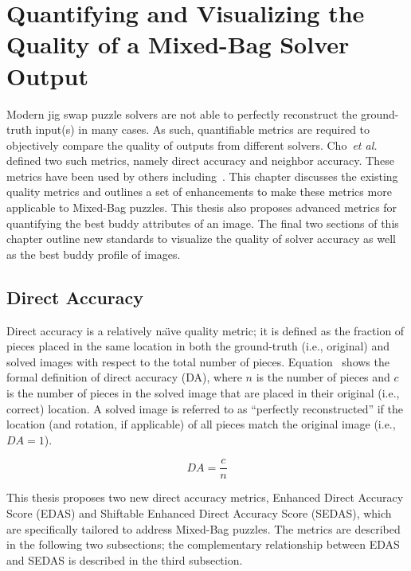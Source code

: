 \chapter{Quantifying and Visualizing the Quality of a Mixed-Bag Solver Output}\label{chap:quantifyingSolverQuantify}

Modern jig swap puzzle solvers are not able to perfectly reconstruct the ground-truth input(s) in many cases.  As such, quantifiable metrics are required to objectively compare the quality of outputs from different solvers.  Cho~\textit{et al.}~\cite{cho2010} defined two such metrics, namely direct accuracy and neighbor accuracy. These metrics have been used by others including~\cite{sholomon2013, pomeranz2011, paikin2015, son2014, gallagher2012}.  This chapter discusses the existing quality metrics and outlines a set of enhancements to make these metrics more applicable to Mixed-Bag puzzles.  This thesis also proposes advanced metrics for quantifying the best buddy attributes of an image.  The final two sections of this chapter outline new standards to visualize the quality of solver accuracy as well as the best buddy profile of images.

\section{Direct Accuracy}\label{sec:directAccuracy}

Direct accuracy is a relatively na\"{\i}ve quality metric; it is defined as the fraction of pieces placed in the same location in both the ground-truth (i.e., original) and solved images with respect to the total number of pieces. Equation~ shows the formal definition of direct accuracy (DA), where $n$ is the number of pieces and $c$ is the number of pieces in the solved image that are placed in their original (i.e., correct) location.  A solved image is referred to as ``perfectly reconstructed'' if the location (and rotation, if applicable) of all pieces match the original image (i.e.,~$DA=1$).

\begin{equation} \label{eq:directAccuracy}
  DA = \frac{c}{n}
\end{equation}

This thesis proposes two new direct accuracy metrics, Enhanced Direct Accuracy Score (EDAS) and Shiftable Enhanced Direct Accuracy Score (SEDAS), which are specifically tailored to address Mixed-Bag puzzles.  The metrics are described in the following two subsections; the complementary relationship between EDAS and SEDAS is described in the third subsection.

